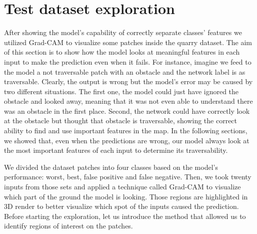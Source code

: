 % 
\section{Test dataset exploration}
\label{sec: quarry-dataset}
After showing the model's capability of correctly separate classes' features we utilized Grad-CAM to visualize some patches inside the quarry dataset. The aim of this section is to show how the model looks at meaningful features in each input to make the prediction even when it fails. For instance, imagine we feed to the model a not traversable patch with an obstacle and the network label is as traversable. Clearly, the output is wrong but the model's error may be caused by two different situations. The first one, the model could just have ignored the obstacle and looked away, meaning that it was not even able to understand there was an obstacle in the first place. Second, the network could have correctly look at the obstacle but thought that obstacle is traversable, showing the correct ability to find and use important features in the map. In the following sections, we showed that, even when the predictions are wrong, our model always look at the most important features of each input to determine its traversability. 

We divided the dataset patches into four classes based on the model's performance: worst, best, false positive and false negative. Then, we took twenty inputs from those sets and applied a technique called Grad-CAM to visualize which part of the ground the model is looking. Those regions are highlighted in 3D render to better visualize which spot of the inputs caused the prediction. Before starting the exploration, let us introduce the method that allowed us to identify regions of interest on the patches. 
